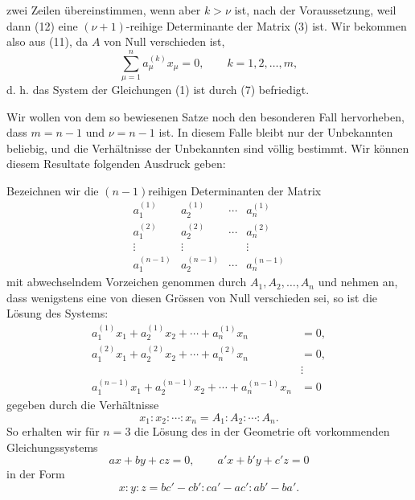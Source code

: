 
zwei Zeilen übereinstimmen, wenn aber $k>\nu$ ist, nach der Voraussetzung, weil dann (12) eine $(\nu+1)$-reihige Determinante der Matrix (3) ist. Wir bekommen also aus (11), da $A$ von Null verschieden ist,
\begin{equation}
 \sum_{\mu=1}^{n}a_\mu^{(k)}x_\mu=0,\qquad k=1,2,\ldots,m,
\tag{13}
\end{equation}
d. h. das System der Gleichungen (1) ist durch (7) befriedigt.

Wir wollen von dem so bewiesenen Satze noch den besonderen Fall hervorheben, dass $m=n-1$ und $\nu=n-1$ ist. In diesem Falle bleibt nur  der Unbekannten beliebig, und die Verhältnisse der Unbekannten sind völlig bestimmt. Wir können diesem Resultate folgenden Ausdruck geben:

Bezeichnen wir die $(n-1)$reihigen Determinanten der Matrix
\begin{equation}
\begin{array}{cccc}
 a_1^{(1)}&a_2^{(1)}&\cdots&a_n^{(1)}\\
 a_1^{(2)}&a_2^{(2)}&\cdots&a_n^{(2)}\\
 \vdots&\vdots&&\vdots\\
 a_1^{(n-1)}&a_2^{(n-1)}&\cdots&a_n^{(n-1)}
\end{array}
\tag{14}
\end{equation}
mit abwechselndem Vorzeichen genommen durch $A_1,A_2,\ldots,A_n$ und nehmen an, dass wenigstens eine von diesen Grössen von Null verschieden sei, so ist die Lösung des Systems:
\begin{equation}
\begin{aligned}
 a_1^{(1)}x_1+a_2^{(1)}x_2+\cdots+a_n^{(1)}x_n&=0,\\
 a_1^{(2)}x_1+a_2^{(2)}x_2+\cdots+a_n^{(2)}x_n&=0,\\
 &\vdots\\
 a_1^{(n-1)}x_1+a_2^{(n-1)}x_2+\cdots+a_n^{(n-1)}x_n&=0
\end{aligned}
\tag{15}
\end{equation}
gegeben durch die Verhältnisse
\begin{equation}
 x_1:x_2:\cdots:x_n=A_1:A_2:\cdots:A_n.
\tag{16}
\end{equation}
So erhalten wir für $n=3$ die Lösung des in der Geometrie oft vorkommenden Gleichungssystems
\begin{equation}
 ax+by+cz=0,\qquad a'x+b'y+c'z=0
\tag{17}
\end{equation}
in der Form
\begin{equation}
 x:y:z=bc'-cb':ca'-ac':ab'-ba'.
\tag{18}
\end{equation}
